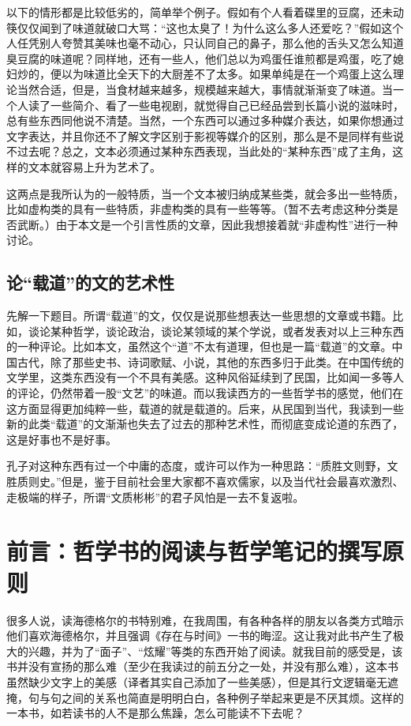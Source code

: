 \documentclass[11pt]{article}
\begin{document}
以下的情形都是比较低劣的，简单举个例子。假如有个人看着碟里的豆腐，还未动筷仅仅闻到了味道就破口大骂：“这也太臭了！为什么这么多人还爱吃？”假如这个人任凭别人夸赞其美味也毫不动心，只认同自己的鼻子，那么他的舌头又怎么知道臭豆腐的味道呢？同样地，还有一些人，他们总以为鸡蛋任谁煎都是鸡蛋，吃了媳妇炒的，便以为味道比全天下的大厨差不了太多。如果单纯是在一个鸡蛋上这么理论当然合适，但是，当食材越来越多，规模越来越大，事情就渐渐变了味道。当一个人读了一些简介、看了一些电视剧，就觉得自己已经品尝到长篇小说的滋味时，总有些东西同他说不清楚。当然，一个东西可以通过多种媒介表达，如果你想通过文字表达，并且你还不了解文字区别于影视等媒介的区别，那么是不是同样有些说不过去呢？总之，文本必须通过某种东西表现，当此处的“某种东西”成了主角，这样的文本就容易上升为艺术了。

这两点是我所认为的一般特质，当一个文本被归纳成某些类，就会多出一些特质，比如虚构类的具有一些特质，非虚构类的具有一些等等。（暂不去考虑这种分类是否武断。）由于本文是一个引言性质的文章，因此我想接着就“非虚构性”进行一种讨论。

\subsection{论“载道”的文的艺术性}
\label{sec:org9924b35}
先解一下题目。所谓“载道”的文，仅仅是说那些想表达一些思想的文章或书籍。比如，谈论某种哲学，谈论政治，谈论某领域的某个学说，或者发表对以上三种东西的一种评论。比如本文，虽然这个“道”不太有道理，但也是一篇“载道”的文章。中国古代，除了那些史书、诗词歌赋、小说，其他的东西多归于此类。在中国传统的文学里，这类东西没有一个不具有美感。这种风俗延续到了民国，比如闻一多等人的评论，仍然带着一股“文艺”的味道。而以我读西方的一些哲学书的感觉，他们在这方面显得更加纯粹一些，载道的就是载道的。后来，从民国到当代，我读到一些新的此类“载道”的文渐渐也失去了过去的那种艺术性，而彻底变成论道的东西了，这是好事也不是好事。

孔子对这种东西有过一个中庸的态度，或许可以作为一种思路：“质胜文则野，文胜质则史。”但是，鉴于目前社会里大家都不喜欢儒家，以及当代社会最喜欢激烈、走极端的样子，所谓“文质彬彬”的君子风怕是一去不复返啦。


\section{前言：哲学书的阅读与哲学笔记的撰写原则}
\label{sec:org174dd63}
很多人说，读海德格尔的书特别难，在我周围，有各种各样的朋友以各类方式暗示他们喜欢海德格尔，并且强调《存在与时间》一书的晦涩。这让我对此书产生了极大的兴趣，并为了“面子”、“炫耀”等类的东西开始了阅读。就我目前的感受是，该书并没有宣扬的那么难（至少在我读过的前五分之一处，并没有那么难），这本书虽然缺少文字上的美感（译者其实自己添加了一些美感），但是其行文逻辑毫无遮掩，句与句之间的关系也简直是明明白白，各种例子举起来更是不厌其烦。这样的一本书，如若读书的人不是那么焦躁，怎么可能读不下去呢？
\end{document}
